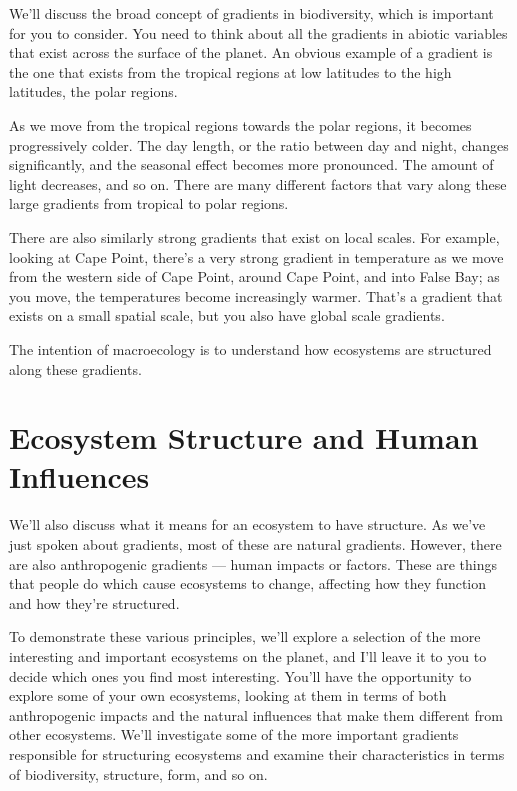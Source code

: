 \documentclass[
  11pt,
]{book}
\begin{document}
We'll discuss the broad concept of gradients in biodiversity, which is
important for you to consider. You need to think about all the gradients
in abiotic variables that exist across the surface of the planet. An
obvious example of a gradient is the one that exists from the tropical
regions at low latitudes to the high latitudes, the polar regions.

As we move from the tropical regions towards the polar regions, it
becomes progressively colder. The day length, or the ratio between day
and night, changes significantly, and the seasonal effect becomes more
pronounced. The amount of light decreases, and so on. There are many
different factors that vary along these large gradients from tropical to
polar regions.

There are also similarly strong gradients that exist on local scales.
For example, looking at Cape Point, there's a very strong gradient in
temperature as we move from the western side of Cape Point, around Cape
Point, and into False Bay; as you move, the temperatures become
increasingly warmer. That's a gradient that exists on a small spatial
scale, but you also have global scale gradients.

The intention of macroecology is to understand how ecosystems are
structured along these gradients.

\section{Ecosystem Structure and Human
Influences}\label{ecosystem-structure-and-human-influences}

We'll also discuss what it means for an ecosystem to have structure. As
we've just spoken about gradients, most of these are natural gradients.
However, there are also anthropogenic gradients --- human impacts or
factors. These are things that people do which cause ecosystems to
change, affecting how they function and how they're structured.

To demonstrate these various principles, we'll explore a selection of
the more interesting and important ecosystems on the planet, and I'll
leave it to you to decide which ones you find most interesting. You'll
have the opportunity to explore some of your own ecosystems, looking at
them in terms of both anthropogenic impacts and the natural influences
that make them different from other ecosystems. We'll investigate some
of the more important gradients responsible for structuring ecosystems
and examine their characteristics in terms of biodiversity, structure,
form, and so on.
\end{document}

